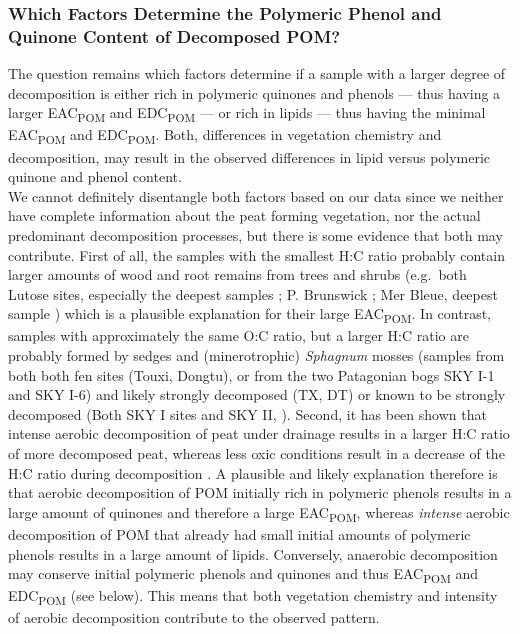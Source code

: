 \documentclass[alpha-refs, lineno]{wiley-article-rmd}
\begin{document}
\hypertarget{which-factors-determine-the-polymeric-phenol-and-quinone-content-of-decomposed-pom}{%
\subsubsection{Which Factors Determine the Polymeric Phenol and Quinone Content of Decomposed POM?}\label{which-factors-determine-the-polymeric-phenol-and-quinone-content-of-decomposed-pom}}

The question remains which factors determine if a sample with a larger degree of decomposition is either rich in polymeric quinones and phenols --- thus having a larger EAC\textsubscript{POM} and EDC\textsubscript{POM} --- or rich in lipids --- thus having the minimal EAC\textsubscript{POM} and EDC\textsubscript{POM}. Both, differences in vegetation chemistry and decomposition, may result in the observed differences in lipid versus polymeric quinone and phenol content.\\
We cannot definitely disentangle both factors based on our data since we neither have complete information about the peat forming vegetation, nor the actual predominant decomposition processes, but there is some evidence that both may contribute. First of all, the samples with the smallest H:C ratio probably contain larger amounts of wood and root remains from trees and shrubs (e.g.~both Lutose sites, especially the deepest samples \autocite{Heffernan.2020}; P. Brunswick \autocite{Broder.2012}; Mer Bleue, deepest sample \autocite{Elliott.2012}) which is a plausible explanation for their large EAC\textsubscript{POM}. In contrast, samples with approximately the same O:C ratio, but a larger H:C ratio are probably formed by sedges and (minerotrophic) \emph{Sphagnum} mosses (samples from both both fen sites (Touxi, Dongtu), or from the two Patagonian bogs SKY I-1 and SKY I-6) and likely strongly decomposed (TX, DT) or known to be strongly decomposed (Both SKY I sites and SKY II, \textcite{Broder.2012}). Second, it has been shown that intense aerobic decomposition of peat under drainage results in a larger H:C ratio of more decomposed peat, whereas less oxic conditions result in a decrease of the H:C ratio during decomposition \autocite{Leifeld.2012}. A plausible and likely explanation therefore is that aerobic decomposition of POM initially rich in polymeric phenols results in a large amount of quinones and therefore a large EAC\textsubscript{POM}, whereas \emph{intense} aerobic decomposition of POM that already had small initial amounts of polymeric phenols results in a large amount of lipids. Conversely, anaerobic decomposition may conserve initial polymeric phenols and quinones and thus EAC\textsubscript{POM} and EDC\textsubscript{POM} (see below). This means that both vegetation chemistry and intensity of aerobic decomposition contribute to the observed pattern.
\end{document}
